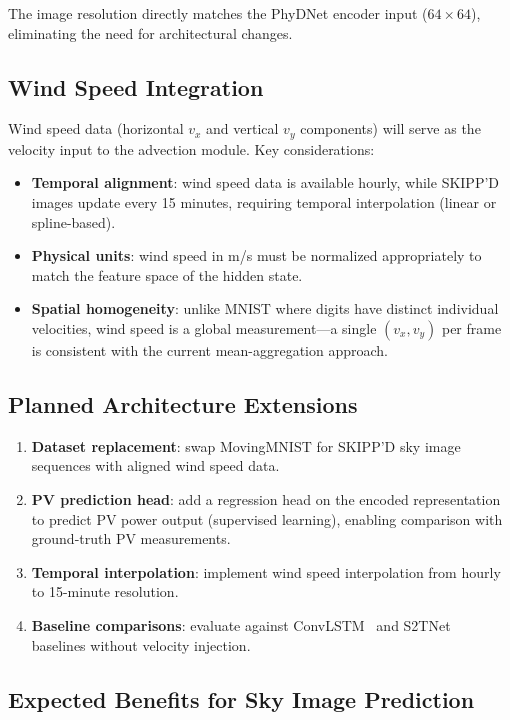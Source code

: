 \documentclass[11pt,a4paper]{article}
\begin{document}
The image resolution directly matches the PhyDNet encoder input ($64 \times 64$), eliminating the need for architectural changes.

\subsection{Wind Speed Integration}

Wind speed data (horizontal $v_x$ and vertical $v_y$ components) will serve as the velocity input to the advection module. Key considerations:
\begin{itemize}[nosep]
    \item \textbf{Temporal alignment}: wind speed data is available hourly, while SKIPP'D images update every 15 minutes, requiring temporal interpolation (linear or spline-based).
    \item \textbf{Physical units}: wind speed in m/s must be normalized appropriately to match the feature space of the hidden state.
    \item \textbf{Spatial homogeneity}: unlike MNIST where digits have distinct individual velocities, wind speed is a global measurement---a single $(v_x, v_y)$ per frame is consistent with the current mean-aggregation approach.
\end{itemize}

\subsection{Planned Architecture Extensions}

\begin{enumerate}[nosep]
    \item \textbf{Dataset replacement}: swap MovingMNIST for SKIPP'D sky image sequences with aligned wind speed data.
    \item \textbf{PV prediction head}: add a regression head on the encoded representation to predict PV power output (supervised learning), enabling comparison with ground-truth PV measurements.
    \item \textbf{Temporal interpolation}: implement wind speed interpolation from hourly to 15-minute resolution.
    \item \textbf{Baseline comparisons}: evaluate against ConvLSTM~\cite{shi2015convlstm} and S2TNet~\cite{leguen2020phydnet} baselines without velocity injection.
\end{enumerate}

\subsection{Expected Benefits for Sky Image Prediction}
\end{document}
